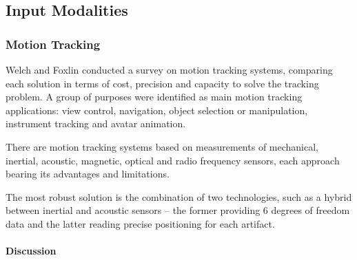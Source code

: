 




\subsection{Input Modalities}

\subsubsection{Motion Tracking}

%
%


Welch and Foxlin \cite{MT-BULLET} conducted a survey on motion tracking systems,
comparing each solution in terms of cost, precision and capacity to solve the tracking problem.
A group of purposes were identified as main motion tracking applications:
view control, navigation, object selection or manipulation, instrument tracking and avatar animation.

There are motion tracking systems based on measurements of mechanical, inertial, acoustic, magnetic,
optical and radio frequency sensors, each approach bearing its advantages and limitations.

The most robust solution is the combination of two technologies, such as a hybrid between
inertial and acoustic sensors -- the former providing 6 degrees of freedom data and the latter
reading precise positioning for each artifact.



\paragraph{Discussion}

